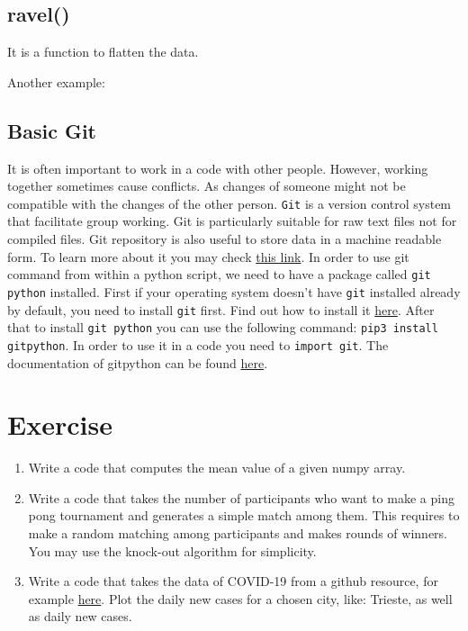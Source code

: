 \documentclass[10pt,a4paper]{article}
\newcommand{\te}{\texttt}
\begin{document}
\subsection{ravel()}
It is a function to flatten the data.

Another example:



\subsection{Basic Git}
It is often important to work in a code with other people. However, working together sometimes cause conflicts. As changes of someone might not be compatible with the changes of the other person. \te{Git} is a version control system that facilitate group working. Git is particularly suitable for raw text files not for compiled files. Git repository is also useful to store data in a machine readable form.  To learn more about it you may check \href{https://www.atlassian.com/git/tutorials}{this link}.
In order to use git command from within a python script, we need to have a package called \te{git python} installed. 
First if your operating system doesn't have \te{git} installed already by default, you need to install \te{git} first. Find out how to install it \href{https://git-scm.com/}{here}.
After that to install \te{git python} you can use the following command:
\te{pip3 install gitpython}. In order to use it in a code you need to \te{import git}. The documentation of gitpython can be found \href{https://gitpython.readthedocs.io/en/stable/intro.html}{here}.
















\section{Exercise}


\begin{enumerate}
\item Write a code that computes the mean value of a given numpy array. %
\item Write a code that takes the number of participants who want to make a  ping pong tournament and generates a simple match among them. This requires to make a random matching among participants and makes rounds of winners. You may use the knock-out algorithm for simplicity.  %
\item Write a code that takes the data of COVID-19 from a github resource, for example \href{https://github.com/pcm-dpc/COVID-19/tree/master/dati-province}{here}. Plot the daily new cases for a chosen city, like: Trieste, as well as daily new cases.
\end{enumerate}
\end{document}
